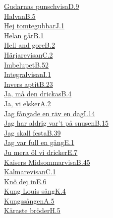   \hyperref[gudarnaspunschvisa]{Gudarnas punschvisa}\dotfill\hyperref[gudarnaspunschvisa]{D.9}\\
  \hyperref[halvan]{Halvan}\dotfill\hyperref[halvan]{B.5}\\
  \hyperref[hejtomtegubbar]{Hej tomtegubbar}\dotfill\hyperref[hejtomtegubbar]{J.1}\\
  \hyperref[helan]{Helan går}\dotfill\hyperref[helan]{B.1}\\
  \hyperref[hellandgore]{Hell and gore}\dotfill\hyperref[hellandgore]{B.2}\\
  \hyperref[harjarevisan]{Härjarevisan}\dotfill\hyperref[harjarevisan]{C.2}\\
  \hyperref[imbelupet]{Imbelupet}\dotfill\hyperref[imbelupet]{B.52}\\
  \hyperref[integralvisan]{Integralvisan}\dotfill\hyperref[integralvisan]{I.1}\\
  \hyperref[inversaptit]{Invers aptit}\dotfill\hyperref[inversaptit]{B.23}\\
  \hyperref[jamadendrickas]{Ja, må den drickas}\dotfill\hyperref[jamadendrickas]{B.4}\\
  \hyperref[vielsker]{Ja, vi elsker}\dotfill\hyperref[vielsker]{A.2}\\
  \hyperref[raven]{Jag fångade en räv en dag}\dotfill\hyperref[raven]{I.14}\\
  \hyperref[snusen]{Jag har aldrig var't på snusen}\dotfill\hyperref[snusen]{B.15}\\
  \hyperref[jagskallfesta]{Jag skall festa}\dotfill\hyperref[jagskallfesta]{B.39}\\
  \hyperref[jagvarfullengang]{Jag var full en gång}\dotfill\hyperref[jagvarfullengang]{E.1}\\
  \hyperref[jumeraolvidricker]{Ju mera öl vi dricker}\dotfill\hyperref[jumeraolvidricker]{E.7}\\
  \hyperref[kaisersmidsommarvisa]{Kaisers Midsommarvisa}\dotfill\hyperref[kaisersmidsommarvisa]{B.45}\\
  \hyperref[kalmarevisan]{Kalmarevisan}\dotfill\hyperref[kalmarevisan]{C.1}\\
  \hyperref[knodejin]{Knô dej in}\dotfill\hyperref[knodejin]{E.6}\\
  \hyperref[kingloui]{Kung Louis sång}\dotfill\hyperref[kingloui]{K.4}\\
  \hyperref[kungssangen]{Kungssången}\dotfill\hyperref[kungssangen]{A.5}\\
  \hyperref[karastebroder]{Käraste bröder}\dotfill\hyperref[karastebroder]{H.5}\\
